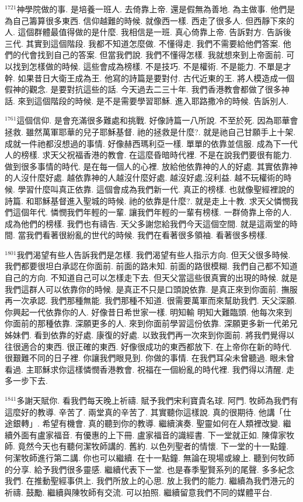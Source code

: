 \documentclass{book}
\begin{document}
$^{1721}$神學院做的事.
是培養一班人.
去倚靠上帝.
還是假無為善地.
為主做事.
他們是為自己籌算很多東西.
信仰越難的時候.
就像西一樣.
西走了很多人.
但西靜下來的人.
這個群體最值得做的是什麼.
我相信是一班.
真心倚靠上帝.
告訴對方.
告訴後三代.
其實到這個階段.
我都不知道怎麼做.
不懂得走.
我們不需要給他們答案.
他們的代會找到自己的答案.
但當我們說.
我們不懂得怎樣.
我就想來到上帝面前.
可以找到怎樣做的時候.
這些會成為榜樣.
不是技巧.
不是權術.
不是能力.
不單是才幹.
如果昔日大衛王成為王.
他寫的詩篇是要對付.
古代近東的王.
將人模造成一個假神的觀念.
是要對抗這些的話.
今天過去二三十年.
我們香港教會都做了很多神話.
來到這個階段的時候.
是不是需要學習耶穌.
進入耶路撒冷的時候.
告訴別人.

$^{1761}$這個信仰.
是會充滿很多難處和挑戰.
好像詩篇一八所說.
不至於死.
因為耶華會拯救.
雖然萬軍耶華的兒子耶穌基督.
祂的拯救是什麼?.
就是祂自己甘願手上十架.
成就一件祂都沒想過的事情.
好像赫西瑪利亞一樣.
單單的依靠並信服.
成為下一代人的榜樣.
求天父祝福香港的教會.
在這麼昏暗時代裡.
不是在說我們要很有能力.
做到很多事情的時代.
是在每一個人的心裡.
放給他依靠神的人的好處.
其實依靠神的人沒什麼好處.
越依靠神的人越沒什麼好處.
越沒好處,沒利益.
越不玩權術的時候.
學習什麼叫真正依靠.
這個會成為我們新一代.
真正的榜樣.
也就像聖經裡說的詩篇.
和耶穌基督進入聖城的時候.
祂的依靠是什麼?.
就是走上十教.
求天父憐憫我們這個年代.
憐憫我們年輕的一輩.
讓我們年輕的一輩有榜樣.
一群倚靠上帝的人.
成為他們的榜樣.
我們也有禱告.
天父多謝您給我們今天這個空間.
就是這兩堂的時間.
當我們看著很紛亂的世代的時候.
我們在看著很多領袖.
看著很多榜樣.

$^{1801}$我們渴望有些人告訴我們是怎樣.
我們渴望有些人指示方向.
但天父很多時候.
我們都要很坦白承認在你面前.
前面的路未知.
前面的路很模糊.
我們自己都不知道自己的方向.
不知道自己可以怎樣走下去.
但天父當這些很真實的出現的時候.
就是我們這群人可以依靠你的時候.
是真正不只是口頭說依靠.
是真正來到你面前.
撫服再一次承認.
我們那種無能.
我們那種不知道.
很需要萬軍而來幫助我們.
天父深願.
你興起一代依靠你的人.
好像昔日希世家一樣.
明知輸 明知大難臨頭.
他每次來到你面前的那種依靠.
深願更多的人.
來到你面前學習這份依靠.
深願更多新一代弟兄姊妹們.
看到依靠的好處.
康復的好處.
以致我們再一次來到你面前.
將我們覺得以往很適合的東西.
很正確的東西.
好像很成功的東西都放下.
在上帝你在新的時代.
很艱難不同的日子裡.
你讓我們眼見到.
你做的事情.
在我們耳朵未曾聽過.
眼未曾看過.
主耶穌求你這樣憐憫香港教會.
祝福在一個紛亂的時代裡.
我們得以清醒.
走多一步下去.

$^{1841}$多謝天賦你.
看我們每天晚上祈禱.
賦予我們宋利寶貴名球.
阿門.
 牧師為我們有這麼好的教導.
辛苦了.
兩堂真的辛苦了.
其實聽你這樣說.
真的很期待.
他講「仕途銀轉」.
希望有機會.
真的聽到你的教導.
繼續演奏.
聖靈如何在人類裡改變.
繼續外面有盧家福音.
有優惠的上下冊.
盧家福音的識經書.
下一堂就正如.
陳偉家牧師.
竟然今天也有聽何潔牧師講的.
舊約.
以色列聖者的情懷.
下一堂的十一點鐘.
何潔牧師進行第二講.
你也可以繼續.
在十一點鐘.
無論在現場或線上.
聽到何牧師的分享.
給予我們很多靈感.
繼續代表下一堂.
也是春季聖賢系列的尾聲.
多多紀念我們.
在推動聖經事供上.
我們所放上的心思.
放上我們的能力.
繼續為我們港元的祈禱.
鼓勵.
繼續與陳牧師有交流.
可以拍照.
繼續留意我們不同的媒體平台.
\end{document}
